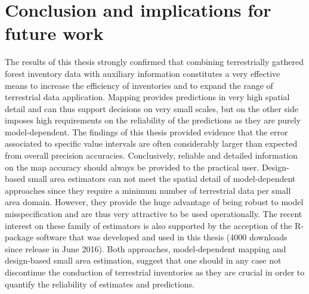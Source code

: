 


\section{Conclusion and implications for future work}
\label{sec:synth:future}

The results of this thesis strongly confirmed that combining terrestrially gathered forest inventory data with auxiliary information constitutes a very effective means to increase the efficiency of inventories and to expand the range of terrestrial data application. Mapping provides predictions in very high spatial detail and can thus support decisions on very small scales, but on the other side imposes high requirements on the reliability of the predictions as they are purely model-dependent. The findings of this thesis provided evidence that the error associated to specific value intervals are often considerably larger than expected from overall precision accuracies. Conclusively, reliable and detailed information on the map accuracy should always be provided to the practical user. Design-based small area estimators can not meet the spatial detail of model-dependent approaches since they require a minimum number of terrestrial data per small area domain. However, they provide the huge advantage of being robust to model misspecification and are thus very attractive to be used operationally. The recent interest on these family of estimators is also supported by the acception of the R-package software that was developed and used in this thesis (4000 downloads since release in June 2016). Both approaches, model-dependent mapping and design-based small area estimation, suggest that one should in any case not discontinue the conduction of terrestrial inventories as they are crucial in order to quantify the reliability of estimates and predictions.\par

